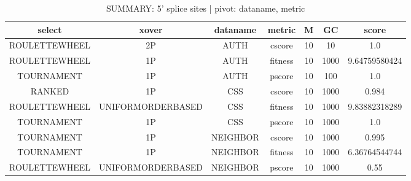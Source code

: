 \begin{table}[H]
	\centering
	\caption{SUMMARY: 5' splice sites | pivot: dataname, metric}
	\vspace{5mm}
	\begin{adjustbox}{width=1\textwidth}
		\begin{tabular}{ |c|c|c|c|c|c|c| }
			\hline
			select & xover & dataname & metric & M & GC & score\\
			\hline
			\hline
			ROULETTEWHEEL & 2P & AUTH & cscore & 10 & 10 & 1.0\\
			\hline
			ROULETTEWHEEL & 1P & AUTH & fitness & 10 & 1000 & 9.64759580424\\
			\hline
			TOURNAMENT & 1P & AUTH & pscore & 10 & 100 & 1.0\\
			\hline
			RANKED & 1P & CSS & cscore & 10 & 1000 & 0.984\\
			\hline
			ROULETTEWHEEL & UNIFORMORDERBASED & CSS & fitness & 10 & 1000 & 9.83882318289\\
			\hline
			TOURNAMENT & 1P & CSS & pscore & 10 & 1000 & 1.0\\
			\hline
			TOURNAMENT & 1P & NEIGHBOR & cscore & 10 & 1000 & 0.995\\
			\hline
			TOURNAMENT & 1P & NEIGHBOR & fitness & 10 & 1000 & 6.36764544744\\
			\hline
			ROULETTEWHEEL & UNIFORMORDERBASED & NEIGHBOR & pscore & 10 & 1000 & 0.55\\
			\hline
		\end{tabular}
	\end{adjustbox}
	\label{score5}
\end{table}
